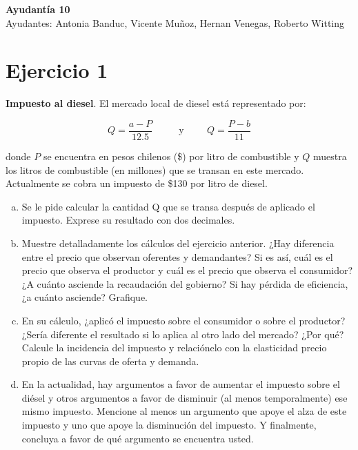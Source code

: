 \documentclass[11pt,letterpaper]{article}
\begin{document}
\begin{center}
    \textbf{\Large{Ayudantía 10}}\\
    Ayudantes: Antonia Banduc, Vicente Muñoz, Hernan Venegas, Roberto Witting
\end{center}



\section*{Ejercicio 1}
\noindent \textbf{Impuesto al diesel}. El mercado local de diesel está representado por:

$$Q = \frac{a-P}{12.5}  \hspace{1cm} \text{ y}   \hspace{1cm}   Q = \frac{P-b}{11}$$

\noindent donde $P$ se encuentra en pesos chilenos (\$) por litro de combustible y $Q$ muestra los litros de combustible (en millones) que se transan en este mercado. Actualmente se cobra un impuesto de \$130 por litro de diesel.
\begin{enumerate}[a)]

\item Se le pide calcular la cantidad Q que se transa después de aplicado el impuesto. Exprese su resultado con dos decimales.


\item  Muestre detalladamente los cálculos del ejercicio anterior. ¿Hay diferencia entre el precio que observan oferentes y demandantes? Si es así, cuál es el precio que observa el productor y cuál es el precio que observa el consumidor? ¿A cuánto asciende la recaudación del gobierno? Si hay pérdida de eficiencia, ¿a cuánto asciende? Grafique.


\item En su cálculo, ¿aplicó el impuesto sobre el consumidor o sobre el productor? ¿Sería diferente el resultado si lo aplica al otro lado del mercado? ¿Por qué? Calcule la incidencia del impuesto y relaciónelo con la elasticidad precio propio de las curvas de oferta y demanda.


\item En la actualidad, hay argumentos a favor de aumentar el impuesto sobre el diésel y otros argumentos a favor de disminuir (al menos temporalmente) ese mismo impuesto. Mencione al menos un argumento que apoye el alza de este impuesto y uno que apoye la disminución del impuesto. Y finalmente, concluya a favor de qué argumento se encuentra usted.

\end{enumerate}
\end{document}
